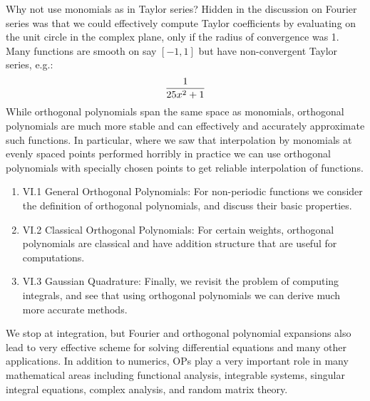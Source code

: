 \documentclass[12pt,a4paper]{book}
\theoremstyle{definition}
\begin{document}
Why not use monomials as in Taylor series? Hidden in the discussion on Fourier series was that we could effectively
compute Taylor coefficients by evaluating on the unit circle in the complex plane, only if the radius of convergence
was 1. Many functions are smooth on say $[-1,1]$ but have non-convergent Taylor series, e.g.:
$$
{1 \over 25x^2 + 1}
$$
While orthogonal polynomials span the same space as monomials, orthogonal polynomials are much more stable and can effectively and accurately
approximate such functions. In particular, where we saw that interpolation
by monomials at evenly spaced points performed horribly in practice we can use orthogonal polynomials
with specially chosen points to get reliable interpolation of functions. 






\begin{enumerate}
    \item VI.1 General Orthogonal Polynomials: For non-periodic functions we consider the definition of orthogonal polynomials, and discuss their basic properties.
    \item VI.2 Classical Orthogonal Polynomials: For certain weights, orthogonal polynomials are classical and have addition structure that are useful for computations.
    \item VI.3 Gaussian Quadrature: Finally, we revisit the  problem of computing integrals, and see that using orthogonal polynomials we can derive much more accurate methods.
    \end{enumerate}

We stop at integration, but Fourier and orthogonal polynomial expansions also lead to very effective scheme for solving differential equations
and many other applications. In addition to numerics, OPs play a very important role in many mathematical areas
including functional analysis, integrable systems, singular integral equations,
complex analysis, and random matrix theory.




% 



\end{document}
